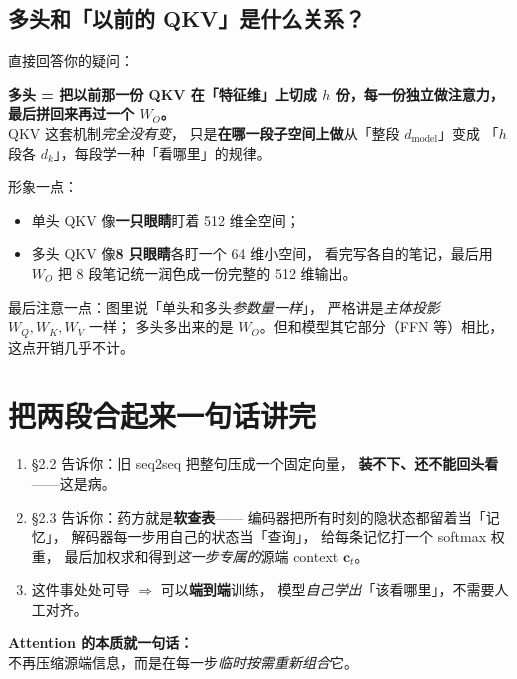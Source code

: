 \documentclass[11pt,a4paper]{ctexart}
\newcommand{\vect}[1]{\boldsymbol{#1}}
\begin{document}
\subsection{多头和「以前的 QKV」是什么关系？}

直接回答你的疑问：

\begin{keypointblock}
\textbf{多头 = 把以前那一份 QKV 在「特征维」上切成 $h$ 份，每一份独立做注意力，最后拼回来再过一个 $W_O$。}\\
QKV 这套机制\emph{完全没有变}，
只是\textbf{在哪一段子空间上做}从「整段 $d_{\text{model}}$」变成
「$h$ 段各 $d_k$」，每段学一种「看哪里」的规律。
\end{keypointblock}

形象一点：

\begin{itemize}
  \item 单头 QKV 像\textbf{一只眼睛}盯着 512 维全空间；
  \item 多头 QKV 像\textbf{8 只眼睛}各盯一个 64 维小空间，
        看完写各自的笔记，最后用 $W_O$ 把 8 段笔记统一润色成一份完整的 512 维输出。
\end{itemize}

最后注意一点：图里说「单头和多头\emph{参数量一样}」，
严格讲是\emph{主体投影} $W_Q, W_K, W_V$ 一样；
多头多出来的是 $W_O$。但和模型其它部分（FFN 等）相比，这点开销几乎不计。

\section{把两段合起来一句话讲完}

\begin{enumerate}
  \item §2.2 告诉你：旧 seq2seq 把整句压成一个固定向量，
        \textbf{装不下、还不能回头看}——这是病。
  \item §2.3 告诉你：药方就是\textbf{软查表}——
        编码器把所有时刻的隐状态都留着当「记忆」，
        解码器每一步用自己的状态当「查询」，
        给每条记忆打一个 softmax 权重，
        最后加权求和得到\emph{这一步专属的}源端 context $\vect{c}_t$。
  \item 这件事处处可导 $\Rightarrow$ 可以\textbf{端到端}训练，
        模型\emph{自己学出}「该看哪里」，不需要人工对齐。
\end{enumerate}

\begin{keypointblock}
\textbf{Attention 的本质就一句话：}\\
不再压缩源端信息，而是在每一步\emph{临时按需重新组合}它。
\end{keypointblock}
\end{document}
